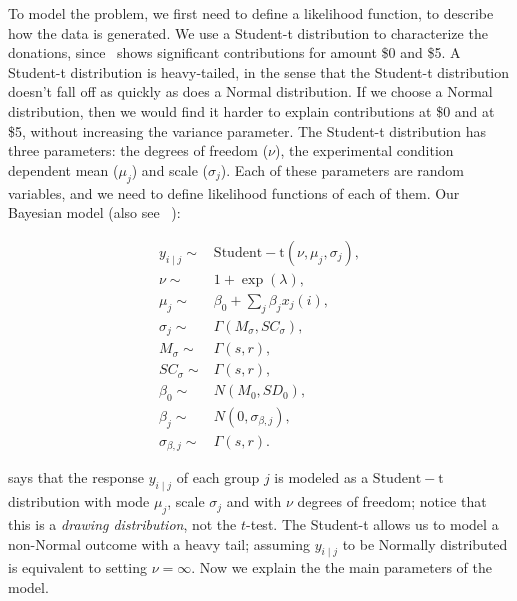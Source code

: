 To model the problem, we first need to define a likelihood function, to describe how the data is generated. We use a Student-t distribution to characterize the donations, since~ shows significant contributions for amount \$0 and \$5. A Student-t distribution is heavy-tailed, in the sense that the Student-t distribution doesn't fall off as quickly as does a Normal distribution. If we choose a Normal distribution, then we would find it harder to explain contributions at \$0 and at \$5, without increasing the variance parameter. The Student-t distribution has three parameters: the degrees of freedom ($\nu$), the experimental condition dependent mean ($\mu_j$) and scale ($\sigma_j$). Each of these parameters are random variables, and we need to define likelihood functions of each of them. Our Bayesian model (also see~ ):


\begin{align}
    y_{i \mid j} \sim &  \mathrm{Student-t}(\nu, \mu_j, \sigma_j), \label{eq:bayesian formulation}\\
    \nu \sim & 1 + \exp(\lambda), \\
    \mu_j \sim & \beta_0 + \sum_j \beta_j x_j(i), \label{eq:mean response}\\
    \sigma_j \sim & \Gamma(M_{\sigma}, SC_{\sigma}),\\
    M_{\sigma} \sim & \Gamma(s,r), \\
    SC_{\sigma} \sim & \Gamma(s,r), \\
    \beta_0 \sim & N(M_0, SD_0), \\
    \beta_j \sim & N (0, \sigma_{\beta, j}), \\
    \sigma_{\beta, j} \sim & \Gamma(s,r).
\end{align}
 
 says that the response $y_{i \mid j}$ of each group $j$ is modeled as a $\mathrm{Student-t}$ distribution with mode $\mu_j$,  scale $\sigma_j$ and with $\nu$ degrees of freedom; notice that this is a \textit{drawing distribution}, not the $t$-test. The Student-t allows us to model a non-Normal outcome with a heavy tail; assuming $y_{i \mid j}$ to be Normally distributed is equivalent to setting $\nu=\infty$. Now we explain the the main parameters of the model.


